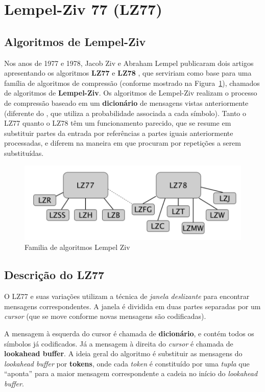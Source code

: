 \section{Lempel-Ziv 77 (LZ77)}

\subsection{Algoritmos de Lempel-Ziv}
Nos anos de 1977 e 1978, Jacob Ziv e Abraham Lempel publicaram dois artigos apresentando os algoritmos \textbf{LZ77} e \textbf{LZ78} \cite{LZ}, que serviriam como base para uma família de algoritmos de compressão (conforme mostrado na Figura~\ref{fig:lz77}), chamados de algoritmos de \textbf{Lempel-Ziv}.
Os algoritmos de Lempel-Ziv realizam o processo de compressão baseado em um \textbf{dicionário} de mensagens vistas anteriormente (diferente do , que utiliza a probabilidade associada a cada símbolo). 
Tanto o LZ77 quanto o LZ78 têm um funcionamento parecido, que se resume em substituir partes da entrada por referências a partes iguais anteriormente processadas, e diferem na maneira em que procuram por repetições a serem substituídas. 

\begin{figure}[h]
   \centering
   \includegraphics[scale=0.75]{figs/lz77fam.png}
    \caption{Familia de algoritmos Lempel Ziv}
    \label{fig:lz77}
 \end{figure}

\subsection{Descrição do LZ77}
O LZ77 e suas variações utilizam a técnica de \emph{janela deslizante} para encontrar mensagens correspondentes. 
A janela é dividida em duas partes separadas por um \emph{cursor} (que se move conforme novas mensagens são codificadas).

A mensagem à esquerda do cursor é chamada de \textbf{dicionário}, e contém todos os símbolos já codificados. Já a mensagem à direita do \emph{cursor} é chamada de \textbf{lookahead buffer}.
A ideia geral do algoritmo é substituir as mensagens do \emph{lookahead buffer} por \textbf{tokens}, onde cada \emph{token} é constituído por uma \emph{tupla} que ``aponta''  para a maior mensagem correspondente a cadeia no início do \emph{lookahead buffer}.

